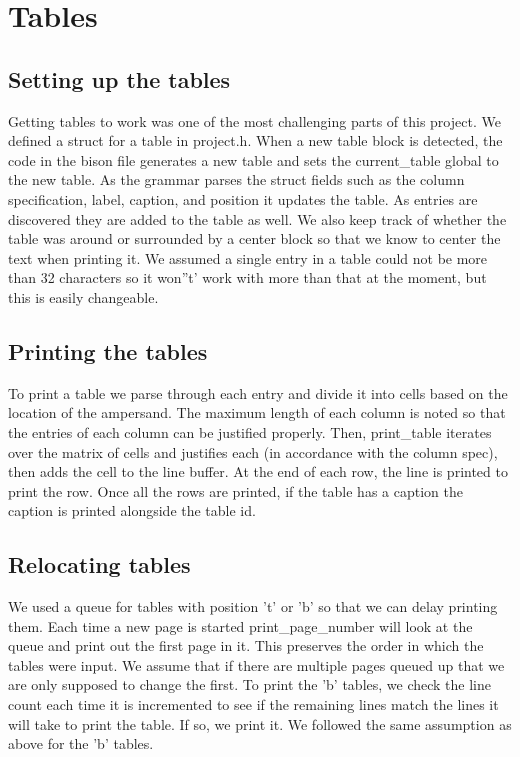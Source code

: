 \section{Tables}

\subsection{Setting up the tables}
Getting tables to work was one of the most challenging parts of this project. We defined a
struct for a table in project.h. When a new table block is detected, the code in the bison
file generates a new table and sets the current_table global to the new table. As the
grammar parses the struct fields such as the column specification, label, caption, and 
position it updates the table. As entries are discovered they are added to the table as
well. We also keep track of whether the table was around or surrounded by a center block 
so that we know to center the text when printing it. We assumed a single entry in a table 
could not be more than 32 characters so it won''t' work with more than that at the moment,
but this is easily changeable.

\subsection{Printing the tables}
To print a table we parse through each entry and divide it into cells based on the location
of the ampersand. The maximum length of each column is noted so that the entries of each 
column can be justified properly. Then, print_table iterates over the matrix of cells and
justifies each (in accordance with the column spec), then adds the cell to the line buffer.
At the end of each row, the line is printed to print the row. Once all the rows are 
printed, if the table has a caption the caption is printed alongside the table id.

\subsection{Relocating tables}
We used a queue for tables with position 't' or 'b' so that we can delay printing
them. Each time a new page is started print_page_number will look at the queue and print
out the first page in it. This preserves the order in which the tables were input. We
assume that if there are multiple pages queued up that we are only supposed to change the
first. To print the 'b' tables, we check the line count each time it is incremented to see
if the remaining lines match the lines it will take to print the table. If so, we print it.
We followed the same assumption as above for the 'b' tables.

